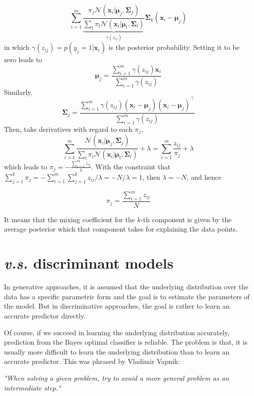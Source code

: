 \documentclass{article}
\begin{document}
	\begin{equation*}
	\sum_{i=1}^m \underbrace{\frac{\pi_j  \mathcal{N} (\bm{x}_i|\bm{\mu}_j,\bm{\Sigma}_j)}{\sum_l \pi_l \mathcal{N} (\bm{x}_i|\bm{\mu}_l,\bm{\Sigma}_l)}}_{\gamma(z_{ij})} \bm{\Sigma}_k (\bm{x}_i - \bm{\mu}_j)
	\end{equation*}
in which $\gamma(z_{ij})=p(y_j=1|\bm{x}_i)$ is the posterior probability. Setting it to be zero leads to
	\begin{equation}
	\bm{\mu}_j=\frac{\sum_{i=1}^m \gamma(z_{ij}) \bm{x}_i}{\sum_{i=1}^m \gamma(z_{ij})}
	\end{equation}
Similarly,
	\begin{equation}
	\bm{\Sigma}_j=\frac{\sum_{i=1}^m \gamma(z_{ij}) (\bm{x}_i-\bm{\mu}_j)(\bm{x}_i-\bm{\mu}_j)^\top}{\sum_{i=1}^m \gamma(z_{ij})}
	\end{equation}
	Then, take derivatives with regard to each $\pi_j$,
	\begin{equation*}
	\sum_{i=1}^m \frac{\mathcal{N} (\bm{x}_i|\bm{\mu}_j,\bm{\Sigma}_j) }{\sum_l \pi_l \mathcal{N} (\bm{x}_i|\bm{\mu}_l,\bm{\Sigma}_l)} + \lambda = \sum_{i=1}^m \frac{z_{ij}}{\pi_j} + \lambda
	\end{equation*}
which leads to $\pi_j=-\frac{\sum_{i=1}^m z_{ij}}{\lambda}$. With the constraint that $\sum_{j=1}^k\pi_j=-\sum_{i=1}^m\sum_{j=1}^k z_{ij}/\lambda = -N/\lambda=1$, then $\lambda=-N$, and hence

	\begin{equation}
	\pi_j=\frac{\sum_{i=1}^m z_{ij}}{N}
	\end{equation}
	
	It means that the mixing coefficient for the $k$-th component is given by the average posterior which that component takes for explaining the data points.
	
\section{\textit{v.s.} discriminant models}
	\label{sec:final}
	In generative approaches, it is assumed that the underlying distribution over the data has a specific parametric form and the goal is to estimate the parameters of the model. But in discriminative approaches, the goal is rather to learn an accurate predictor directly. 
	
	Of course, if we succeed in learning the underlying distribution accurately, prediction from the Bayes optimal classifier is reliable. The problem is that, it is usually more difficult to learn the underlying distribution than to learn an accurate predictor. This was phrased by Vladimir Vapnik:
	\begin{center}
	\textit{"When solving a given problem, try to avoid a more general problem as an intermediate step."}
	\end{center}
\end{document}
